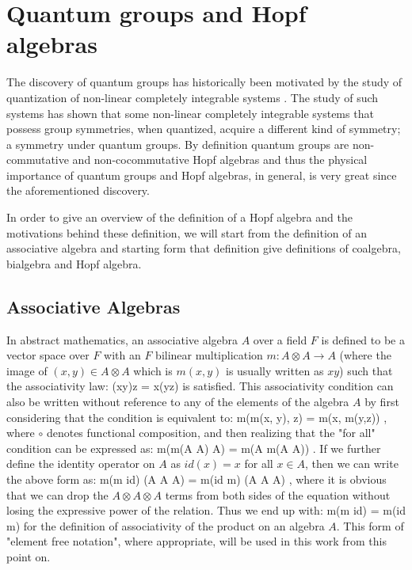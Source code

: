 \section{Quantum groups and Hopf algebras}

The discovery of quantum groups has historically been motivated by the study
of quantization of non-linear completely integrable systems \cite{sklyanin}. The study of
such systems has shown that some non-linear completely integrable systems that
possess group symmetries, when quantized, acquire a different kind of symmetry;
a symmetry under quantum groups. By definition quantum groups are non-commutative and
non-cocommutative Hopf algebras and thus the physical importance of quantum groups and
Hopf algebras, in general, is very great since the aforementioned discovery.

In order to give an overview of the definition of a Hopf algebra and the motivations
behind these definition, we will start from the definition of an associative algebra
and starting form that definition give definitions of coalgebra, bialgebra and Hopf
algebra.

\subsection{Associative Algebras}
In abstract mathematics, an associative algebra $A$ over a field $F$ is
defined to be a vector space over
$F$ with an $F$ bilinear multiplication $m: A \otimes A \rightarrow A$ (where the image of
$(x, y) \in A \otimes A$ which is $m(x,y)$ is usually written as $xy$) such that the associativity
law:
\beq
(xy)z = x(yz) \quad {}
\eeq
is satisfied. This associativity condition can also be written without reference to any of
the elements of the algebra $A$ by first considering that the condition is equivalent to:
\beq
m\circ(m(x, y), z) = m\circ(x, m(y,z)) \quad {},
\eeq
where $\circ$ denotes functional composition,
and then realizing that the "for all" condition can be expressed as:
\beq
m\circ(m(A \otimes A) \otimes A) = m\circ(A \otimes m(A \otimes A)) \quad .
\eeq
If we further define the identity operator on $A$ as $id(x) = x$
for all $x \in A$, then we can write the above form as:
\beq
m\circ(m \otimes id) (A \otimes A \otimes A) = m\circ(id \otimes m) (A \otimes A \otimes A) \quad ,
\eeq
where it is obvious that we can drop the $A \otimes A \otimes A$ terms from both sides
of the equation without losing the expressive power of the relation. Thus we end up with:
\beq
m\circ(m \otimes id) = m\circ(id \otimes m)
\eeq
for the definition of associativity of the product on an algebra $A$. This form of "element free
notation", where appropriate, will be used in this work from this point on.

